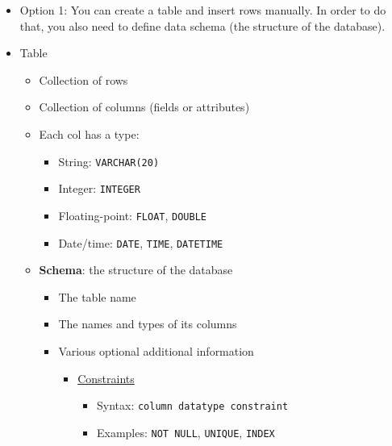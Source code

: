 \documentclass[
]{book}
\providecommand{\tightlist}{%
  \setlength{\itemsep}{0pt}\setlength{\parskip}{0pt}}
\begin{document}
\begin{itemize}
\item
  Option 1: You can create a table and insert rows manually. In order to do that, you also need to define data schema (the structure of the database).
\item
  Table

  \begin{itemize}
  \tightlist
  \item
    Collection of rows
  \item
    Collection of columns (fields or attributes)
  \item
    Each col has a type:

    \begin{itemize}
    \tightlist
    \item
      String: \texttt{VARCHAR(20)}
    \item
      Integer: \texttt{INTEGER}
    \item
      Floating-point: \texttt{FLOAT}, \texttt{DOUBLE}
    \item
      Date/time: \texttt{DATE}, \texttt{TIME}, \texttt{DATETIME}
    \end{itemize}
  \item
    \textbf{Schema}: the structure of the database

    \begin{itemize}
    \tightlist
    \item
      The table name
    \item
      The names and types of its columns
    \item
      Various optional additional information

      \begin{itemize}
      \tightlist
      \item
        \href{https://www.w3schools.com/sql/sql_constraints.asp}{Constraints}

        \begin{itemize}
        \tightlist
        \item
          Syntax: \texttt{column\ datatype\ constraint}
        \item
          Examples: \texttt{NOT\ NULL}, \texttt{UNIQUE}, \texttt{INDEX}
        \end{itemize}
      \end{itemize}
    \end{itemize}
  \end{itemize}
\end{itemize}
\end{document}
